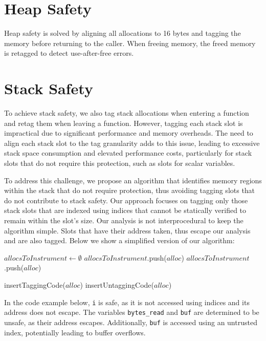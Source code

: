 \section{Heap Safety}

Heap safety is solved by aligning all allocations to 16 bytes and tagging the memory before returning to the caller.
When freeing memory, the freed memory is retagged to detect use-after-free errors.

\section{Stack Safety}

To achieve stack safety, we also tag stack allocations when entering a function and retag them when leaving a function.
However, tagging each stack slot is impractical due to significant performance and memory overheads.
The need to align each stack slot to the tag granularity adds to this issue, leading to excessive stack space consumption and elevated performance costs, particularly for stack slots that do not require this protection, such as slots for scalar variables.

To address this challenge, we propose an algorithm that identifies memory regions within the stack that do not require protection, thus avoiding tagging slots that do not contribute to stack safety. %
Our approach focuses on tagging only those stack slots that are indexed using indices that cannot be statically verified to remain within the slot's size.
Our analysis is not interprocedural to keep the algorithm simple.
Slots that have their address taken, thus escape our analysis and are also tagged.
Below we show a simplified version of our algorithm:

\begin{algorithmic}
    \State $allocsToInstrument \gets \emptyset$
            \State $allocsToInstrument$.push($alloc$)
        \EndIf
            \State $allocsToInstrument$.push($alloc$)
        \EndIf
    \EndFor

        \State insertTaggingCode($alloc$)
        \State insertUntaggingCode($alloc$)
    \EndFor
\end{algorithmic}


In the code example below, \texttt{i} is safe, as it is not accessed using indices and its address does not escape.
The variables \texttt{bytes\_read} and \texttt{buf} are determined to be unsafe, as their address escapes.
Additionally, \texttt{buf} is accessed using an untrusted index, potentially leading to buffer overflows.

